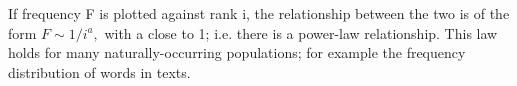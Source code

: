         If frequency F is plotted against rank i, the relationship between the two
is of the form $ F \sim 1 / i ^a , $ with a close to 1; i.e. there
is a power-law relationship. This law holds for many naturally-occurring
populations; for example the frequency distribution of words in
texts.	